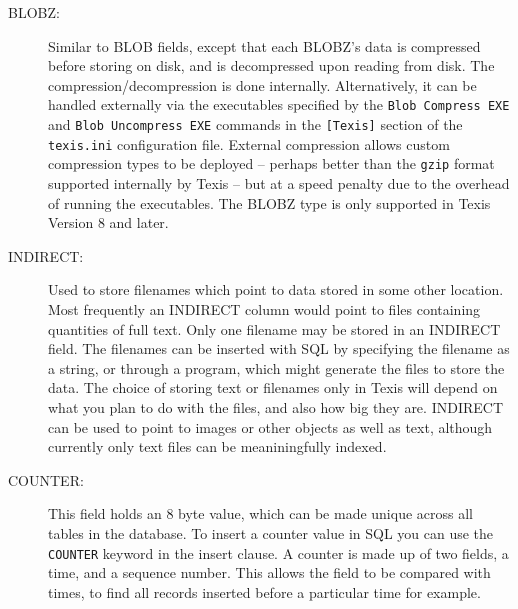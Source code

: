 \begin{description}
\begin{description}
\item[BLOBZ:] Similar to BLOB fields, except that each BLOBZ's data is
  compressed before storing on disk, and is decompressed upon reading
  from disk.  The compression/decompression is done internally.
  Alternatively, it can be handled externally via the executables
  specified by the {\tt Blob Compress EXE} and {\tt Blob Uncompress EXE}
  commands in the \verb`[Texis]` section of the
  \verb`texis.ini` configuration file.  External compression allows
  custom compression types to be deployed -- perhaps better than the
  \verb`gzip` format supported internally by Texis -- but at a speed
  penalty due to the overhead of running the executables.  The BLOBZ
  type is only supported in Texis Version 8 and later.

\item[INDIRECT:] Used to store filenames which point to data stored in
some other location.  Most frequently an INDIRECT column would point
to files containing quantities of full text.
Only one filename may be stored in an INDIRECT field.  The filenames
can be inserted with SQL by specifying the filename as a string, or
through a program, which might generate the files to store the data.
The choice of storing
text or filenames only in Texis will depend on what you plan to do
with the files, and also how big they are.  INDIRECT can be used to
point to images or other objects as well as text, although currently
only text files can be meaniningfully indexed.

\item[COUNTER:] This field holds an 8 byte value, which can be made
unique across all tables in the database.  To insert a counter
value in SQL you can use the \verb`COUNTER` keyword in the insert clause.
A counter is made up of two fields, a time, and a sequence number.
This allows the field to be compared with times, to find all records
inserted before a particular time for example.


\end{description}
\end{description}
